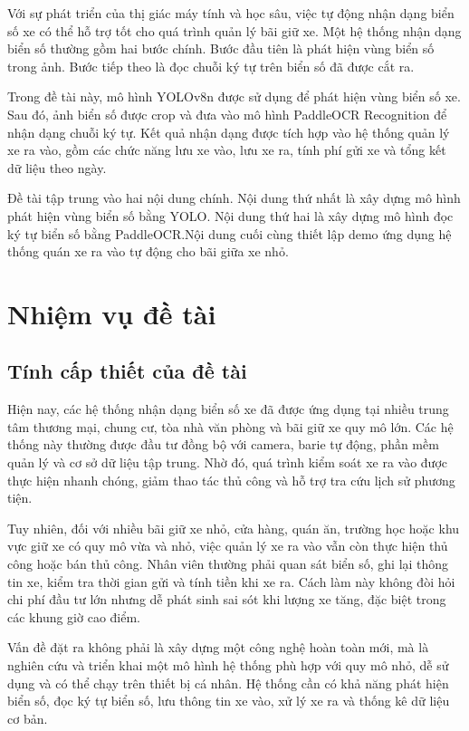 \documentclass[13pt,a4paper]{report}
\begin{document}
Với sự phát triển của thị giác máy tính và học sâu, việc tự động nhận dạng biển số xe có thể hỗ trợ tốt cho quá trình quản lý bãi giữ xe. Một hệ thống nhận dạng biển số thường gồm hai bước chính. Bước đầu tiên là phát hiện vùng biển số trong ảnh. Bước tiếp theo là đọc chuỗi ký tự trên biển số đã được cắt ra.

Trong đề tài này, mô hình YOLOv8n được sử dụng để phát hiện vùng biển số xe. Sau đó, ảnh biển số được crop và đưa vào mô hình PaddleOCR Recognition để nhận dạng chuỗi ký tự. Kết quả nhận dạng được tích hợp vào hệ thống quản lý xe ra vào, gồm các chức năng lưu xe vào, lưu xe ra, tính phí gửi xe và tổng kết dữ liệu theo ngày.

Đề tài tập trung vào hai nội dung chính. Nội dung thứ nhất là xây dựng mô hình phát hiện vùng biển số bằng YOLO. Nội dung thứ hai là xây dựng mô hình đọc ký tự biển số bằng PaddleOCR.Nội dung cuối cùng thiết lập demo ứng dụng hệ thống quán xe ra vào tự động cho bãi giữa xe nhỏ.

\section{Nhiệm vụ đề tài}

\subsection{Tính cấp thiết của đề tài}

Hiện nay, các hệ thống nhận dạng biển số xe đã được ứng dụng tại nhiều trung tâm thương mại, chung cư, tòa nhà văn phòng và bãi giữ xe quy mô lớn. Các hệ thống này thường được đầu tư đồng bộ với camera, barie tự động, phần mềm quản lý và cơ sở dữ liệu tập trung. Nhờ đó, quá trình kiểm soát xe ra vào được thực hiện nhanh chóng, giảm thao tác thủ công và hỗ trợ tra cứu lịch sử phương tiện.

Tuy nhiên, đối với nhiều bãi giữ xe nhỏ, cửa hàng, quán ăn, trường học hoặc khu vực giữ xe có quy mô vừa và nhỏ, việc quản lý xe ra vào vẫn còn thực hiện thủ công hoặc bán thủ công. Nhân viên thường phải quan sát biển số, ghi lại thông tin xe, kiểm tra thời gian gửi và tính tiền khi xe ra. Cách làm này không đòi hỏi chi phí đầu tư lớn nhưng dễ phát sinh sai sót khi lượng xe tăng, đặc biệt trong các khung giờ cao điểm.

Vấn đề đặt ra không phải là xây dựng một công nghệ hoàn toàn mới, mà là nghiên cứu và triển khai một mô hình hệ thống phù hợp với quy mô nhỏ, dễ sử dụng và có thể chạy trên thiết bị cá nhân. Hệ thống cần có khả năng phát hiện biển số, đọc ký tự biển số, lưu thông tin xe vào, xử lý xe ra và thống kê dữ liệu cơ bản. 
\end{document}
